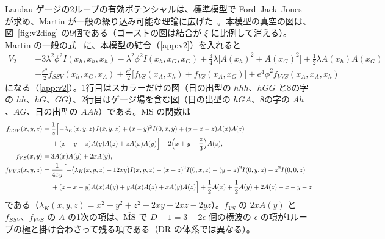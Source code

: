 \documentclass[a4paper,10pt]{ltjsarticle}
\newcommand{\MSbar}{\overline{\mathrm{MS}}}
\begin{document}
Landau ゲージの2ループの有効ポテンシャルは、標準模型で Ford--Jack--Jones~\cite{fjj92} が求め、Martin が一般の繰り込み可能な理論に広げた~\cite{martin01}。本模型の真空の図は、図~\ref{fig:v2diag} の9個である（ゴーストの図は結合が $\xi$ に比例して消える）。Martin の一般の式~\cite{martin01} に、本模型の結合（\ref{app:v2}）を入れると
\begin{equation}
\begin{aligned}
V_2={}&-3\lambda^2\phi^2I(x_h,x_h,x_h)-\lambda^2\phi^2I(x_h,x_G,x_G)+\frac34\lambda\bigl[A(x_h)^2+A(x_G)^2\bigr]+\frac12\lambda A(x_h)A(x_G)\\
&+\frac{e^2}2f_{SSV}(x_h,x_G,x_A)+\frac{e^2}2\bigl[f_{VS}(x_A,x_h)+f_{VS}(x_A,x_G)\bigr]+e^4\phi^2f_{VVS}(x_A,x_A,x_h)
\end{aligned}
\label{eq:V2}
\end{equation}
になる（\ref{app:v2}）。1行目はスカラーだけの図（日の出型の $hhh$、$hGG$ と8の字の $hh$、$hG$、$GG$）、2行目はゲージ場を含む図（日の出型の $hGA$、8の字の $Ah$、$AG$、日の出型の $AAh$）である。$\MSbar$ の関数は
\begin{equation}
\begin{aligned}
f_{SSV}(x,y,z)={}&\frac1z\Bigl[-\lambda_K(x,y,z)\,I(x,y,z)+(x-y)^2I(0,x,y)+(y-x-z)A(x)A(z)\\
&+(x-y-z)A(y)A(z)+zA(x)A(y)\Bigr]+2\Bigl(x+y-\frac z3\Bigr)A(z),\\
f_{VS}(x,y)={}&3A(x)A(y)+2xA(y),\\
f_{VVS}(x,y,z)={}&\frac1{4xy}\Bigl[-\bigl(\lambda_K(x,y,z)+12xy\bigr)I(x,y,z)+(x-z)^2I(0,x,z)+(y-z)^2I(0,y,z)-z^2I(0,0,z)\\
&+(z-x-y)A(x)A(y)+yA(x)A(z)+xA(y)A(z)\Bigr]+\frac12A(x)+\frac12A(y)+2A(z)-x-y-z
\end{aligned}
\label{eq:fs}
\end{equation}
である（$\lambda_K(x,y,z)=x^2+y^2+z^2-2xy-2xz-2yz$）。$f_{VS}$ の $2xA(y)$ と $f_{SSV}$、$f_{VVS}$ の $A$ の1次の項は、$\MSbar$ で $D-1=3-2\epsilon$ 個の横波の $\epsilon$ の項が1ループの極と掛け合わさって残る項である（DR の体系では異なる）。
\end{document}
